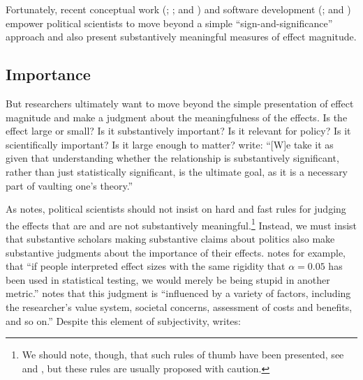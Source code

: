\documentclass[12pt]{article}
\begin{document}

Fortunately, recent conceptual work (\citealt{KingTomzWittenberg2000}; \citealt{BerryDeMerittEsarey2010}; and \citealt{HanmerKalkan2013}) and software development (\citealt{TomzWittenbergKing2003}; and \citealt{ImaiKingLau2007}) empower political scientists to move beyond a simple ``sign-and-significance'' approach and also present substantively meaningful measures of effect magnitude.

\subsection*{Importance}

But researchers ultimately want to move beyond the simple presentation of effect magnitude and make a judgment about the meaningfulness of the effects. Is the effect large or small? Is it substantively important? Is it relevant for policy? Is it scientifically important? Is it large enough to matter? \citet[p. 264]{HanmerKalkan2013} write: ``[W]e take it as given that understanding whether the relationship is substantively significant, rather than just statistically significant, is the ultimate goal, as it is a necessary part of vaulting one's theory.''

As \cite{Rainey2014} notes, political scientists should not insist on hard and fast rules for judging the effects that are and are not substantively meaningful.\footnote{We should note, though, that such rules of thumb have been presented, see \cite{Glass1976} and \cite{Cohen1992}, but these rules are usually proposed with caution.} Instead, we must insist that substantive scholars making substantive claims about politics also make substantive judgments about the importance of their effects. \citet[pp. 82-83]{Thompson2001} notes for example, that ``if people interpreted effect sizes with the same rigidity that $\alpha = 0.05$ has been used in statistical testing, we would merely be being stupid in another metric.'' \cite{Kirk1996} notes that this judgment is ``influenced by a variety of factors, including the researcher's value system, societal concerns, assessment of costs and benefits, and so on.'' Despite this element of subjectivity, \citet[p. 30]{Thompson2002} writes: 
\end{document}
